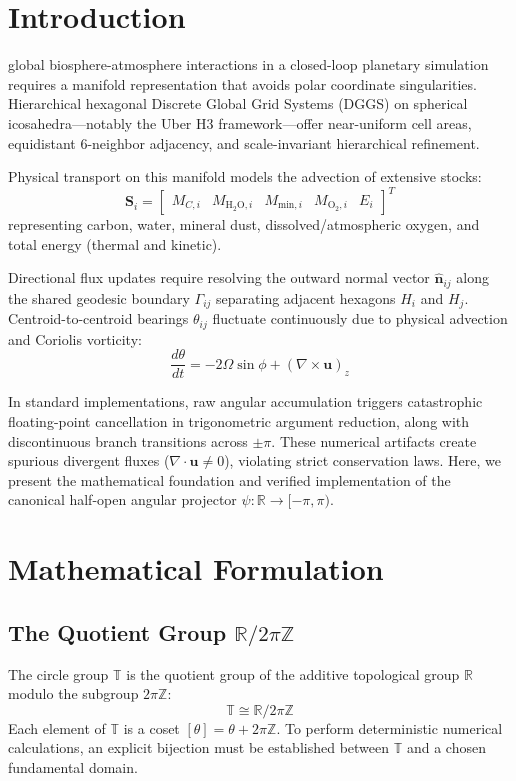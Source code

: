 \documentclass[10pt,journal,compsoc]{IEEEtran}
\begin{document}
\section{Introduction}
 global biosphere-atmosphere interactions in a closed-loop planetary simulation requires a manifold representation that avoids polar coordinate singularities. Hierarchical hexagonal Discrete Global Grid Systems (DGGS) on spherical icosahedra—notably the Uber H3 framework—offer near-uniform cell areas, equidistant 6-neighbor adjacency, and scale-invariant hierarchical refinement.

Physical transport on this manifold models the advection of extensive stocks:
\begin{equation}
\mathbf{S}_i = \begin{bmatrix} M_{C, i} & M_{\text{H}_2\text{O}, i} & M_{\text{min}, i} & M_{\text{O}_2, i} & E_i \end{bmatrix}^T
\end{equation}
representing carbon, water, mineral dust, dissolved/atmospheric oxygen, and total energy (thermal and kinetic).

Directional flux updates require resolving the outward normal vector $\hat{\mathbf{n}}_{ij}$ along the shared geodesic boundary $\Gamma_{ij}$ separating adjacent hexagons $H_i$ and $H_j$. Centroid-to-centroid bearings $\theta_{ij}$ fluctuate continuously due to physical advection and Coriolis vorticity:
\begin{equation}
\frac{d\theta}{dt} = -2\Omega \sin\phi + (\nabla \times \mathbf{u})_z
\end{equation}

In standard implementations, raw angular accumulation triggers catastrophic floating-point cancellation in trigonometric argument reduction, along with discontinuous branch transitions across $\pm \pi$. These numerical artifacts create spurious divergent fluxes ($\nabla \cdot \mathbf{u} \neq 0$), violating strict conservation laws. Here, we present the mathematical foundation and verified implementation of the canonical half-open angular projector $\psi: \mathbb{R} \to [-\pi, \pi)$.

\section{Mathematical Formulation}

\subsection{The Quotient Group $\mathbb{R} / 2\pi\mathbb{Z}$}
The circle group $\mathbb{T}$ is the quotient group of the additive topological group $\mathbb{R}$ modulo the subgroup $2\pi\mathbb{Z}$:
\begin{equation}
\mathbb{T} \cong \mathbb{R} / 2\pi\mathbb{Z}
\end{equation}
Each element of $\mathbb{T}$ is a coset $[\theta] = \theta + 2\pi\mathbb{Z}$. To perform deterministic numerical calculations, an explicit bijection must be established between $\mathbb{T}$ and a chosen fundamental domain.
\end{document}
